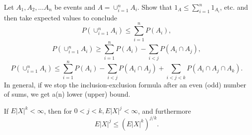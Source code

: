 \documentclass[en, normal, 11pt, black]{elegantnote}
\newenvironment{exercise}[1]{\begin{tcolorbox}[colback=black!15, colframe=black!80, breakable, title=#1]}{\end{tcolorbox}}
\begin{document}
    \begin{exercise}{1.6.10. Bonferroni inequalities.}
        Let $A_{1}, A_{2}, \ldots A_{n}$ be events and $A=\cup_{i=1}^{n} A_{i} .$ Show that $1_{A} \leq \sum_{i=1}^{n} 1_{A_{i}}$, etc. and then take expected values to conclude
        \[
            P\left(\cup_{i=1}^{n} A_{i}\right) \leq \sum_{i=1}^{n} P\left(A_{i}\right), 
        \]
        \[
            P\left(\cup_{i=1}^{n} A_{i}\right) \geq \sum_{i=1}^{n} P\left(A_{i}\right)-\sum_{i<j} P\left(A_{i} \cap A_{j}\right), 
        \]
        \[
            P\left(\cup_{i=1}^{n} A_{i}\right) \leq \sum_{i=1}^{n} P\left(A_{i}\right)-\sum_{i<j} P\left(A_{i} \cap A_{j}\right)+\sum_{i<j<k} P\left(A_{i} \cap A_{j} \cap A_{k}\right). 
        \]
        In general, if we stop the inclusion-exclusion formula after an even (odd) number of sums, we get a(n) lower (upper) bound. 
    \end{exercise}


    \begin{exercise}{1.6.11.}
        If $E|X|^{k}<\infty$, then for $0<j<k, E|X|^{j}<\infty$, and furthermore 
        \[
            E|X|^{j} \leq\left(E|X|^{k}\right)^{j / k}. 
        \]
    \end{exercise}
\end{document}
